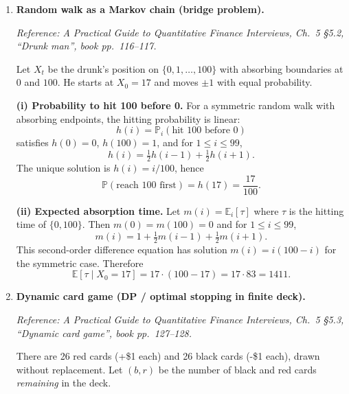 \documentclass[11pt]{article}
\begin{document}
\begin{enumerate}[leftmargin=*, itemsep=1.0em]
\textbf{Step 2: reduce to a 1D Markov chain.}
Condition on $F_1$ (the process ends with all balls color 1).
Let $X_k$ be the number of balls of color 1 after $k$ steps (under this conditioning).
Then $X_k\in\{1,2,\dots,n\}$ and $n$ is absorbing.

Under the conditioned chain, one can compute the transition probabilities (see the book) and set up
the standard mean-time-to-absorption recursion for
\[
Z_i \coloneqq \mathbb{E}[N_n \mid F_1,\ X_0=i].
\]
With boundary $Z_n=0$ and a second-order recursion, the system solves to
\[
Z_1=(n-1)^2.
\]
Since $X_0=1$ in the initial ``all different'' configuration (exactly one ball is color 1),
\[
\boxed{\mathbb{E}[N_n]=Z_1=(n-1)^2.}
\]

\item \textbf{Random walk as a Markov chain (bridge problem).}

\textit{Reference: A Practical Guide to Quantitative Finance Interviews, Ch.\ 5 \S5.2, ``Drunk man'', book pp.\ 116--117.}

\medskip
Let $X_t$ be the drunk's position on $\{0,1,\dots,100\}$ with absorbing boundaries at $0$ and $100$.
He starts at $X_0=17$ and moves $\pm 1$ with equal probability.

\textbf{(i) Probability to hit 100 before 0.}
For a symmetric random walk with absorbing endpoints, the hitting probability is linear:
\[
h(i)=\mathbb{P}_i(\text{hit }100\text{ before }0)
\]
satisfies $h(0)=0$, $h(100)=1$, and for $1\le i\le 99$,
\[
h(i)=\tfrac12 h(i-1)+\tfrac12 h(i+1).
\]
The unique solution is $h(i)=i/100$, hence
\[
\boxed{\mathbb{P}(\text{reach 100 first})=h(17)=\frac{17}{100}.}
\]

\textbf{(ii) Expected absorption time.}
Let $m(i)=\mathbb{E}_i[\tau]$ where $\tau$ is the hitting time of $\{0,100\}$.
Then $m(0)=m(100)=0$ and for $1\le i\le 99$,
\[
m(i)=1+\tfrac12 m(i-1)+\tfrac12 m(i+1).
\]
This second-order difference equation has solution $m(i)=i(100-i)$ for the symmetric case.
Therefore
\[
\boxed{\mathbb{E}[\tau\mid X_0=17]=17\cdot(100-17)=17\cdot 83=1411.}
\]

\item \textbf{Dynamic card game (DP / optimal stopping in finite deck).}

\textit{Reference: A Practical Guide to Quantitative Finance Interviews, Ch.\ 5 \S5.3, ``Dynamic card game'', book pp.\ 127--128.}

\medskip
There are 26 red cards (+\$1 each) and 26 black cards (-\$1 each), drawn without replacement.
Let $(b,r)$ be the number of black and red cards \emph{remaining} in the deck.


\end{enumerate}
\end{document}
